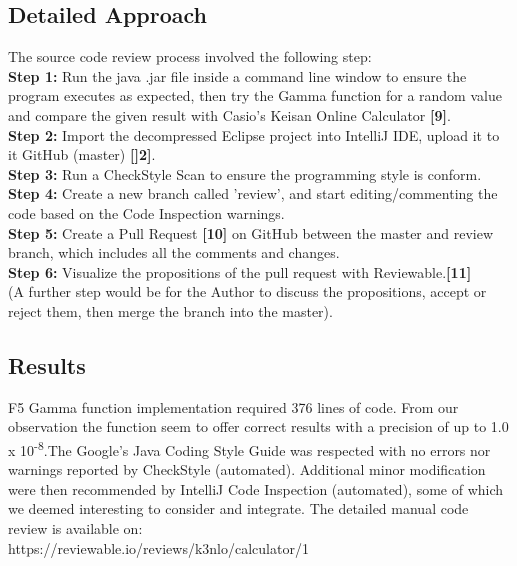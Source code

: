 \documentclass[12pt]{extarticle}
\newcommand{\<}{\langle}
\renewcommand{\>}{\rangle}
\theoremstyle{definition}
\begin{document}
\subsection{Detailed Approach}
The source code review process involved the following step:\\

\noindent\textbf{Step 1:} Run the java .jar file inside a command line window to ensure the program executes as expected, then try the Gamma function for a random value and compare the given result with Casio's Keisan Online Calculator \textbf{[9]}.\\

\noindent\textbf{Step 2:} Import the decompressed Eclipse project into IntelliJ IDE, upload it to it GitHub (master) \textbf{[]2]}.\\

\noindent\textbf{Step 3:} Run a CheckStyle Scan to ensure the programming style is conform.\\

\noindent\textbf{Step 4:} Create a new branch called 'review', and start editing/commenting the code based on the Code Inspection warnings.\\

\noindent\textbf{Step 5:} Create a Pull Request \textbf{[10]} on GitHub between the master and review branch, which includes all the comments and changes. \\

\noindent\textbf{Step 6:} Visualize the propositions of the pull request with Reviewable.\textbf{[11]} \\ 
(A further step would be for the Author to discuss the propositions, accept or reject them, then merge the branch into the master).


\subsection{Results}
F5 Gamma function implementation required 376 lines of code. From our observation the function seem to offer correct results with a precision of up to 1.0 x 10\textsuperscript{-8}.The Google's Java Coding Style Guide was respected with no errors nor warnings reported by CheckStyle (automated). Additional minor modification were then recommended by IntelliJ Code Inspection (automated), some of which we deemed interesting to consider and integrate. The detailed manual code review is available on: \\ https://reviewable.io/reviews/k3nlo/calculator/1
\end{document}
